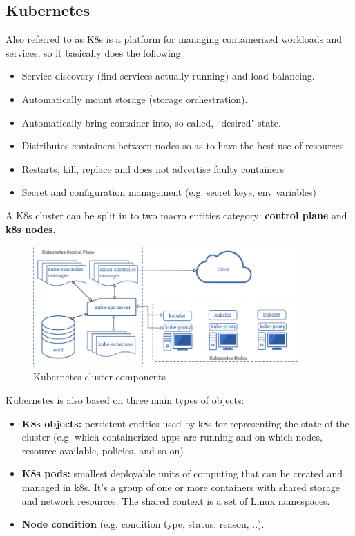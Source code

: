 \documentclass{article}
\begin{document}
\subsection{Kubernetes}
Also referred to as K8s is a platform for managing containerized workloads and services, so it basically does the following:
\begin{itemize}
    \item Service discovery (find services actually running) and load balancing.
    \item Automatically mount storage (storage orchestration).
    \item Automatically bring container into, so called, ``desired" state.
    \item Distributes containers between nodes so as to have the best use of resources
    \item Restarts, kill, replace and does not advertise faulty containers
    \item Secret and configuration management (e.g. secret keys, env variables)
\end{itemize}

A K8s cluster can be split in to two macro entities category: \textbf{control plane} and \textbf{k8s nodes}. 
\begin{figure}[H]
    \centering
    \includegraphics[width=4in]{imgs/The-control-components-of-K8S-45.png}
    \caption{Kubernetes cluster components}
    \label{fig:k8scomp}
\end{figure}

Kubernetes is also based on three main types of objects:
\begin{itemize}
    \item \textbf{K8s objects:} persistent entities used by k8s for representing the state of the cluster (e.g. which containerized apps are running and on which nodes, resource available, policies, and so on)
    \item \textbf{K8s pods:} smallest deployable units of computing that can be created and managed in k8s. It's a group of one or more containers with shared storage and network resources. The shared context is a set of Linux namespaces.
    \item \textbf{Node condition} (e.g. condition type, status, reason, ..).
\end{itemize}
\end{document}
